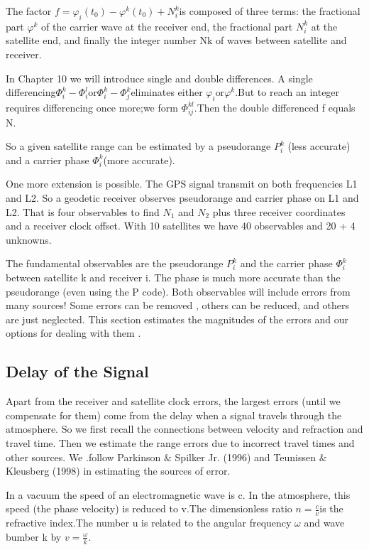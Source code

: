 	The factor $f=\varphi_i(t_0)-\varphi^k(t_0)+N^k_i$is composed of three terms: the fractional part $\varphi^k$ of the carrier wave at the receiver end, the fractional part $N^k_i$ at the satellite end, and	finally the integer number Nk of waves between satellite and receiver. 
	
	In Chapter 10 we will introduce single and double differences. A single differencing$\Phi^k_i-\Phi^l_i$or$\Phi^k_i-\Phi^k_j$eliminates either $\varphi_i$or$\varphi^k$.But to reach an integer requires differencing once more;we form $\Phi^{kl}_{ij}$.Then the double differenced f equals N.
	
	So a given satellite range can be estimated by a pseudorange $P^k_i$ (less accurate) and	a carrier phase $\Phi^k_i$(more accurate).
	
	One more extension is possible. The GPS signal transmit on both frequencies L1 and L2. So a geodetic receiver observes pseudorange and carrier phase on L1 and L2. That is four observables to find $N_1$ and $N_2$ plus three receiver coordinates and a receiver clock offset. With 10 satellites we have 40 observables and 20 + 4 unknowns.
	
	The fundamental observables are the pseudorange $P^k_i$ and the carrier phase $\Phi^k_i$ between satellite k and receiver i. The phase is much more accurate than the pseudorange (even using the P code). Both observables will include errors from many sources! Some errors can be removed , others can be reduced, and others are just neglected. This section estimates the magnitudes of the errors and our options for dealing with them .
	
	\subsection{Delay of the Signal}
	
		Apart from the receiver and satellite clock errors, the largest errors (until we compensate for them) come from the delay when a signal travels through the atmosphere. So we first recall the connections between velocity and refraction and travel time. Then we estimate the range errors due to incorrect travel times and other sources. We .follow Parkinson $\&$ Spilker Jr. (1996) and Teunissen $\&$ Kleusberg (1998) in estimating the sources of error.
		
		In a vacuum the speed of an electromagnetic wave is c. In the atmosphere, this speed (the phase velocity) is reduced to v.The dimensionless ratio $n=\frac{c}{v}$is the refractive index.The number u is related to the angular frequency $\omega$ and wave bumber k by $v=\frac{\omega}{k}$.
		
